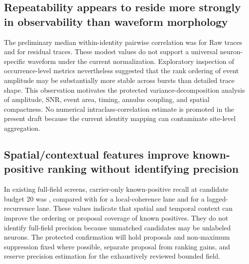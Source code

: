 
\subsection{Repeatability appears to reside more strongly in observability than waveform morphology}

The preliminary median within-identity pairwise correlation was \RawWithinSiteMedianCorrelation{} for Raw traces and \ResidualWithinSiteMedianCorrelation{} for residual traces. These modest values do not support a universal neuron-specific waveform under the current normalization. Exploratory inspection of occurrence-level metrics nevertheless suggested that the rank ordering of event amplitude may be substantially more stable across bursts than detailed trace shape. This observation motivates the protected variance-decomposition analysis of amplitude, SNR, event area, timing, annulus coupling, and spatial compactness. No numerical intraclass-correlation estimate is promoted in the present draft because the current identity mapping can contaminate site-level aggregation.


\subsection{Spatial/contextual features improve known-positive ranking without identifying precision}

In existing full-field screens, carrier-only known-positive recall at candidate budget 20 was \CarrierRecallBtwenty{}, compared with \CoherenceRecallBtwenty{} for a local-coherence lane and \LagRecallBtwenty{} for a lagged-recurrence lane. These values indicate that spatial and temporal context can improve the ordering or proposal coverage of known positives. They do not identify full-field precision because unmatched candidates may be unlabeled neurons. The protected confirmation will hold proposals and non-maximum suppression fixed where possible, separate proposal from ranking gains, and reserve precision estimation for the exhaustively reviewed bounded field.

